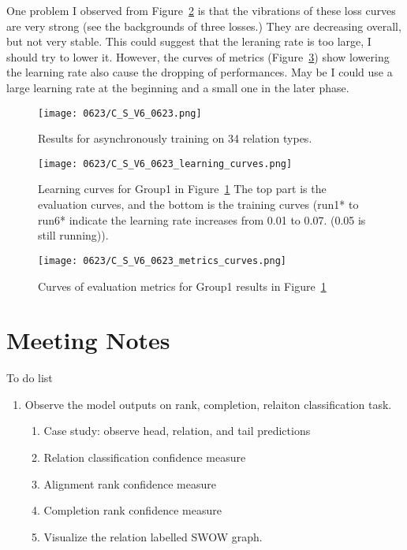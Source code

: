 One problem I observed from Figure~\ref{fig:asynchronously_training_results_curves} is that the vibrations of these loss curves are very strong (see the backgrounds of three losses.) They are decreasing overall, but not very stable. This could suggest that the leraning rate is too large, I should try to lower it. However,  the curves of metrics (Figure~\ref{fig:asynchronously_metrics_results_curves}) show lowering the learning rate also cause the dropping of performances. May be I could use a large learning rate at the beginning and a small one in the later phase. 


\begin{figure}[!ht]
    \centering
    \texttt{[image: 0623/C\_S\_V6\_0623.png]}
    \caption{\label{tab:asynchronously_training_results} Results for asynchronously training on 34 relation types. }
\end{figure}
\begin{figure}[!ht]
    \centering
    \texttt{[image: 0623/C\_S\_V6\_0623\_learning\_curves.png]}
    \caption{\label{fig:asynchronously_training_results_curves} Learning curves for Group1 in Figure~\ref{tab:asynchronously_training_results} The top part is the evaluation curves, and the bottom is the training curves (run1* to run6* indicate the learning rate increases from 0.01 to 0.07. (0.05 is still running)).}
\end{figure}
\begin{figure}[H]
    \texttt{[image: 0623/C\_S\_V6\_0623\_metrics\_curves.png]}
    \caption{\label{fig:asynchronously_metrics_results_curves}  Curves of evaluation metrics for Group1 results in Figure~\ref{tab:asynchronously_training_results} }
\end{figure}

\section{Meeting Notes}


To do list 
\begin{enumerate}
    \item Observe the model outputs on rank, completion, relaiton classification task.
    \begin{enumerate}
        \item Case study: observe head, relation, and tail predictions 
        \item Relation classification confidence measure
        \item Alignment rank confidence measure
        \item Completion rank confidence measure
        \item Visualize the relation labelled SWOW graph. 
    \end{enumerate}
\end{enumerate}


